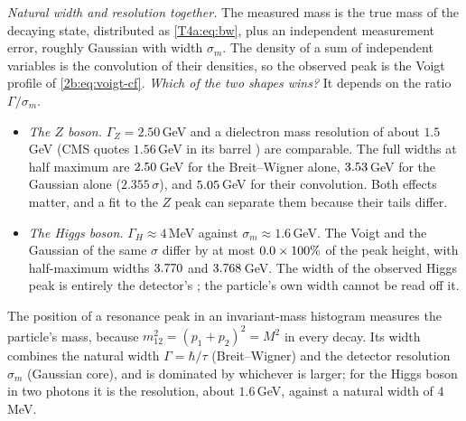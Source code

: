 \emph{Natural width and resolution together.} The measured mass is the true mass of the decaying state, distributed as \eqref{T4a:eq:bw}, plus an independent measurement error, roughly Gaussian with width $\sigma_m$. The density of a sum of independent variables is the convolution of their densities, so the observed peak is the Voigt profile of \eqref{2b:eq:voigt-cf}. \emph{Which of the two shapes wins?} It depends on the ratio $\Gamma/\sigma_m$.
\begin{itemize}[itemsep=1pt,leftmargin=1.2em]
  \item \emph{The $Z$ boson.} $\Gamma_Z=2.50$\,GeV and a dielectron mass resolution of about $1.5$\,GeV (CMS quotes $1.56$\,GeV in its barrel \cite[Sec.~3]{ChatrchyanHiggs2012}) are comparable. The full widths at half maximum are $\tfouraR{2}{\TfFwBZ}$\,GeV for the Breit--Wigner alone, $\tfouraR{2}{\TfFwGZ}$\,GeV for the Gaussian alone ($2.355\,\sigma$), and $\tfouraR{2}{\TfFwVZ}$\,GeV for their convolution. Both effects matter, and a fit to the $Z$ peak can separate them because their tails differ.
  \item \emph{The Higgs boson.} $\Gamma_H\approx4$\,MeV against $\sigma_m\approx1.6$\,GeV. The Voigt and the Gaussian of the same $\sigma$ differ by at most $\tfouraR{1}{\TfVHrel}\times100\%$ of the peak height, with half-maximum widths $\tfouraR{3}{\TfFwVH}$ and $\tfouraR{3}{\TfFwGH}$\,GeV. The width of the observed Higgs peak is entirely the detector's \cite[Sec.~4]{ChatrchyanHiggs2012}; the particle's own width cannot be read off it.
\end{itemize}

\begin{keyidea}
The position of a resonance peak in an invariant-mass histogram measures the particle's mass, because $m_{12}^2=(p_1+p_2)^2=M^2$ in every decay. Its width combines the natural width $\Gamma=\hbar/\tau$ (Breit--Wigner) and the detector resolution $\sigma_m$ (Gaussian core), and is dominated by whichever is larger; for the Higgs boson in two photons it is the resolution, about $1.6$\,GeV, against a natural width of $4$\,MeV.
\end{keyidea}

